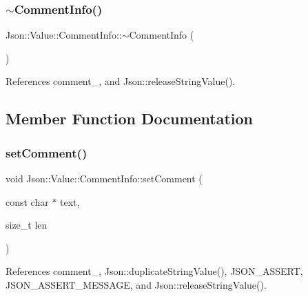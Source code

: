 \mbox{\label{structJson_1_1Value_1_1CommentInfo_ab4d0877190bdbf484e4e2a3bade42ac8_ab4d0877190bdbf484e4e2a3bade42ac8}} 
\subsubsection{\texorpdfstring{$\sim$\+Comment\+Info()}{~CommentInfo()}}
{\footnotesize\ttfamily Json\+::\+Value\+::\+Comment\+Info\+::$\sim$\+Comment\+Info (\begin{DoxyParamCaption}{ }\end{DoxyParamCaption})}



References comment\+\_\+, and Json\+::release\+String\+Value().



\subsection{Member Function Documentation}
\mbox{\label{structJson_1_1Value_1_1CommentInfo_a4d01c2cd8c07995969c5d636dfd4fa8c_a4d01c2cd8c07995969c5d636dfd4fa8c}} 
\subsubsection{\texorpdfstring{set\+Comment()}{setComment()}}
{\footnotesize\ttfamily void Json\+::\+Value\+::\+Comment\+Info\+::set\+Comment (\begin{DoxyParamCaption}\item[{const char $\ast$}]{text,  }\item[{size\+\_\+t}]{len }\end{DoxyParamCaption})}



References comment\+\_\+, Json\+::duplicate\+String\+Value(), J\+S\+O\+N\+\_\+\+A\+S\+S\+E\+RT, J\+S\+O\+N\+\_\+\+A\+S\+S\+E\+R\+T\+\_\+\+M\+E\+S\+S\+A\+GE, and Json\+::release\+String\+Value().



